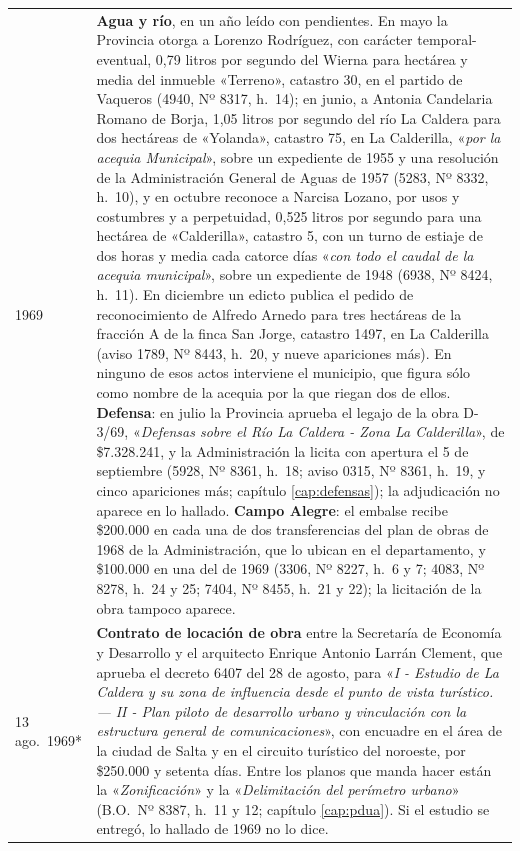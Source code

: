 \begin{longtable}{@{}p{2.7cm}p{10.3cm}@{}}
1969 & \textbf{Agua y río}, en un año leído con pendientes. En mayo la Provincia otorga a Lorenzo Rodríguez, con carácter temporal-eventual, 0,79 litros por segundo del Wierna para hectárea y media del inmueble «Terreno», catastro 30, en el partido de Vaqueros (4940, Nº 8317, h.\ 14); en junio, a Antonia Candelaria Romano de Borja, 1,05 litros por segundo del río La Caldera para dos hectáreas de «Yolanda», catastro 75, en La Calderilla, «\textit{por la acequia Municipal}», sobre un expediente de 1955 y una resolución de la Administración General de Aguas de 1957 (5283, Nº 8332, h.\ 10), y en octubre reconoce a Narcisa Lozano, por usos y costumbres y a perpetuidad, 0,525 litros por segundo para una hectárea de «Calderilla», catastro 5, con un turno de estiaje de dos horas y media cada catorce días «\textit{con todo el caudal de la acequia municipal}», sobre un expediente de 1948 (6938, Nº 8424, h.\ 11). En diciembre un edicto publica el pedido de reconocimiento de Alfredo Arnedo para tres hectáreas de la fracción A de la finca San Jorge, catastro 1497, en La Calderilla (aviso 1789, Nº 8443, h.\ 20, y nueve apariciones más). En ninguno de esos actos interviene el municipio, que figura sólo como nombre de la acequia por la que riegan dos de ellos. \textbf{Defensa}: en julio la Provincia aprueba el legajo de la obra D-3/69, «\textit{Defensas sobre el Río La Caldera - Zona La Calderilla}», de \$7.328.241, y la Administración la licita con apertura el 5 de septiembre (5928, Nº 8361, h.\ 18; aviso 0315, Nº 8361, h.\ 19, y cinco apariciones más; capítulo \ref{cap:defensas}); la adjudicación no aparece en lo hallado. \textbf{Campo Alegre}: el embalse recibe \$200.000 en cada una de dos transferencias del plan de obras de 1968 de la Administración, que lo ubican en el departamento, y \$100.000 en una del de 1969 (3306, Nº 8227, h.\ 6 y 7; 4083, Nº 8278, h.\ 24 y 25; 7404, Nº 8455, h.\ 21 y 22); la licitación de la obra tampoco aparece. \\
13 ago.\ 1969* & \textbf{Contrato de locación de obra} entre la Secretaría de Economía y Desarrollo y el arquitecto Enrique Antonio Larrán Clement, que aprueba el decreto 6407 del 28 de agosto, para «\textit{I - Estudio de La Caldera y su zona de influencia desde el punto de vista turístico. --- II - Plan piloto de desarrollo urbano y vinculación con la estructura general de comunicaciones}», con encuadre en el área de la ciudad de Salta y en el circuito turístico del noroeste, por \$250.000 y setenta días. Entre los planos que manda hacer están la «\textit{Zonificación}» y la «\textit{Delimitación del perímetro urbano}» (B.O.\ Nº 8387, h.\ 11 y 12; capítulo \ref{cap:pdua}). Si el estudio se entregó, lo hallado de 1969 no lo dice. \\

\end{longtable}
